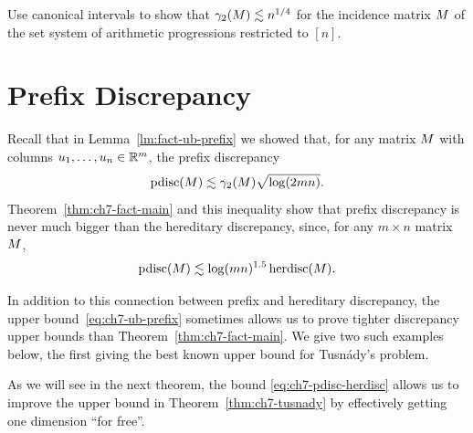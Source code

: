 \begin{exercise}
  Use canonical intervals to show that $\gamma_2(M)\lesssim
  n^{1/4}$ for the incidence matrix $M$ of the set system of
  arithmetic progressions restricted to $[n]$.
\end{exercise}
\section{Prefix Discrepancy}

Recall that in Lemma~\ref{lm:fact-ub-prefix} we showed that, for any
matrix $M$ with columns $u_1, \ldots, u_n \in \mathbb{R}^m$, the prefix discrepancy
\begin{equation}\label{eq:ch7-ub-prefix}
  \operatorname{pdisc}(M) \lesssim \gamma_2(M)\sqrt{\log(2mn)}.
\end{equation}
Theorem~\ref{thm:ch7-fact-main} and this inequality show that prefix
discrepancy is never much bigger than the hereditary discrepancy,
since, for any $m\times n$ matrix $M$,
\begin{equation}
  \label{eq:ch7-pdisc-herdisc}
  \operatorname{pdisc}(M) \lesssim \log(mn)^{1.5} \operatorname{herdisc}(M).
\end{equation}

In addition to this connection between prefix and hereditary
discrepancy, the upper bound~\eqref{eq:ch7-ub-prefix} sometimes allows us to
prove tighter discrepancy upper bounds than
Theorem~\ref{thm:ch7-fact-main}. We give two such examples below, the
first giving the best known  upper bound for Tusn\'ady's problem.

\medskip
{} As we will see in the next theorem, the
bound \eqref{eq:ch7-pdisc-herdisc} allows us to improve the upper
bound in Theorem~\ref{thm:ch7-tusnady} by effectively getting one
dimension ``for free''.

